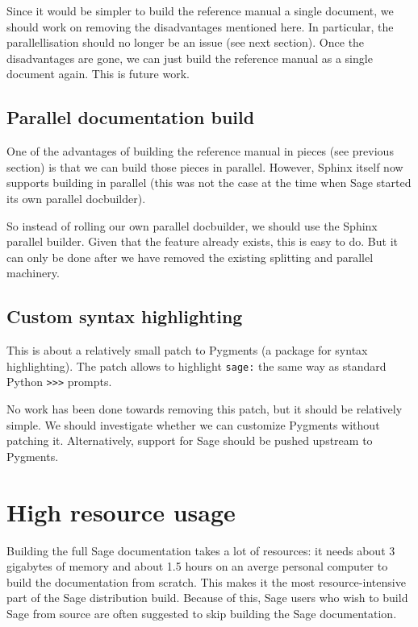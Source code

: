 \documentclass{deliverablereport}
\begin{document}
Since it would be simpler to build the reference manual a single document,
we should work on removing the disadvantages mentioned here.
In particular, the parallellisation should no longer be an issue
(see next section).
Once the disadvantages are gone, we can just build the reference manual
as a single document again.
This is future work.

\subsection{Parallel documentation build}

One of the advantages of building the reference manual in pieces
(see previous section) is that we can build those pieces in parallel.
However, Sphinx itself now supports building in parallel
(this was not the case at the time when Sage started its own parallel docbuilder).

So instead of rolling our own parallel docbuilder,
we should use the Sphinx parallel builder.
Given that the feature already exists, this is easy to do.
But it can only be done after we have removed the existing
splitting and parallel machinery.


\subsection{Custom syntax highlighting}

This is about a relatively small patch to Pygments
(a package for syntax highlighting).
The patch allows to highlight \texttt{sage:} the same way
as standard Python \texttt{>>>} prompts.

No work has been done towards removing this patch,
but it should be relatively simple.
We should investigate whether we can customize Pygments without
patching it.
Alternatively, support for Sage should be pushed upstream to Pygments.

\section{High resource usage}

Building the full Sage documentation takes a lot of resources:
it needs about 3 gigabytes of memory and about 1.5 hours
on an averge personal computer to build the documentation from scratch.
This makes it the most resource-intensive part of the
Sage distribution build.
Because of this, Sage users who wish to build Sage from source are often
suggested to skip building the Sage documentation.
\end{document}
